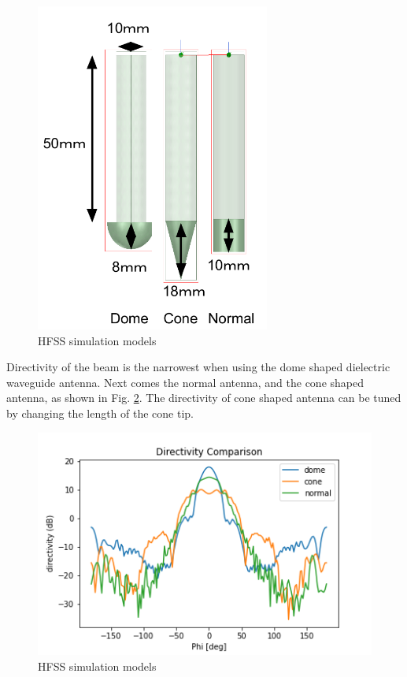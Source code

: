 \documentclass[a4paper,12pt]{report}
\begin{document}
\begin{figure}
  \begin{center}
    \includegraphics[clip, keepaspectratio, width=0.5\linewidth]{img/3_hfss_simulation_models.png}
    \caption{HFSS simulation models}
    \label{fig:3_hfss_simulation_models} 
  \end{center}
\end{figure}

Directivity of the beam is the narrowest when using the dome shaped
dielectric waveguide antenna.
Next comes the normal antenna, and the cone shaped antenna,
as shown in Fig. \ref{fig:directivity_comparison_hfss}.
The directivity of cone shaped antenna can be tuned by
changing the length of the cone tip.

\begin{figure}
  \begin{center}
    \includegraphics[clip, keepaspectratio, width=0.9\linewidth]{img/directivity_comparison_hfss.png}
    \caption{HFSS simulation models}
    \label{fig:directivity_comparison_hfss} 
  \end{center}
\end{figure}
\end{document}
